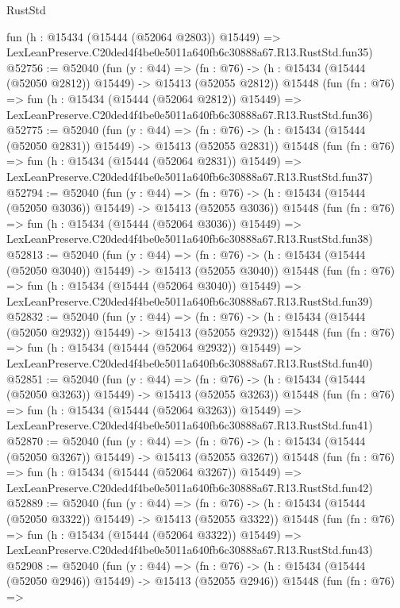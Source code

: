\begin{lexlean}{RustStd}
\begin{coremodule}
    fun (h : @15434 (@15444 (@52064 @2803)) @15449) =>
    LexLeanPreserve.C20ded4f4be0e5011a640fb6c30888a67.R13.RustStd.fun35)
@52756 := @52040
    (fun (y : @44) =>
    (fn : @76) -> (h : @15434 (@15444 (@52050 @2812)) @15449) -> @15413 (@52055 @2812))
    @15448
    (fun (fn : @76) =>
    fun (h : @15434 (@15444 (@52064 @2812)) @15449) =>
    LexLeanPreserve.C20ded4f4be0e5011a640fb6c30888a67.R13.RustStd.fun36)
@52775 := @52040
    (fun (y : @44) =>
    (fn : @76) -> (h : @15434 (@15444 (@52050 @2831)) @15449) -> @15413 (@52055 @2831))
    @15448
    (fun (fn : @76) =>
    fun (h : @15434 (@15444 (@52064 @2831)) @15449) =>
    LexLeanPreserve.C20ded4f4be0e5011a640fb6c30888a67.R13.RustStd.fun37)
@52794 := @52040
    (fun (y : @44) =>
    (fn : @76) -> (h : @15434 (@15444 (@52050 @3036)) @15449) -> @15413 (@52055 @3036))
    @15448
    (fun (fn : @76) =>
    fun (h : @15434 (@15444 (@52064 @3036)) @15449) =>
    LexLeanPreserve.C20ded4f4be0e5011a640fb6c30888a67.R13.RustStd.fun38)
@52813 := @52040
    (fun (y : @44) =>
    (fn : @76) -> (h : @15434 (@15444 (@52050 @3040)) @15449) -> @15413 (@52055 @3040))
    @15448
    (fun (fn : @76) =>
    fun (h : @15434 (@15444 (@52064 @3040)) @15449) =>
    LexLeanPreserve.C20ded4f4be0e5011a640fb6c30888a67.R13.RustStd.fun39)
@52832 := @52040
    (fun (y : @44) =>
    (fn : @76) -> (h : @15434 (@15444 (@52050 @2932)) @15449) -> @15413 (@52055 @2932))
    @15448
    (fun (fn : @76) =>
    fun (h : @15434 (@15444 (@52064 @2932)) @15449) =>
    LexLeanPreserve.C20ded4f4be0e5011a640fb6c30888a67.R13.RustStd.fun40)
@52851 := @52040
    (fun (y : @44) =>
    (fn : @76) -> (h : @15434 (@15444 (@52050 @3263)) @15449) -> @15413 (@52055 @3263))
    @15448
    (fun (fn : @76) =>
    fun (h : @15434 (@15444 (@52064 @3263)) @15449) =>
    LexLeanPreserve.C20ded4f4be0e5011a640fb6c30888a67.R13.RustStd.fun41)
@52870 := @52040
    (fun (y : @44) =>
    (fn : @76) -> (h : @15434 (@15444 (@52050 @3267)) @15449) -> @15413 (@52055 @3267))
    @15448
    (fun (fn : @76) =>
    fun (h : @15434 (@15444 (@52064 @3267)) @15449) =>
    LexLeanPreserve.C20ded4f4be0e5011a640fb6c30888a67.R13.RustStd.fun42)
@52889 := @52040
    (fun (y : @44) =>
    (fn : @76) -> (h : @15434 (@15444 (@52050 @3322)) @15449) -> @15413 (@52055 @3322))
    @15448
    (fun (fn : @76) =>
    fun (h : @15434 (@15444 (@52064 @3322)) @15449) =>
    LexLeanPreserve.C20ded4f4be0e5011a640fb6c30888a67.R13.RustStd.fun43)
@52908 := @52040
    (fun (y : @44) =>
    (fn : @76) -> (h : @15434 (@15444 (@52050 @2946)) @15449) -> @15413 (@52055 @2946))
    @15448
    (fun (fn : @76) =>

\end{coremodule}
\end{lexlean}
